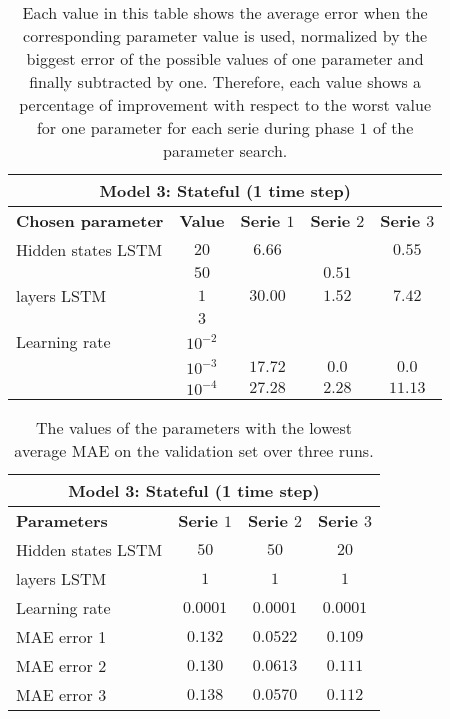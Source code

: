 \begin{table}[ht]
	\centering
	\begin{tabular}{@{}l||c|ccc@{}} \toprule
		\multicolumn{5}{c}{Model 3: Stateful (1 time step)}\\\midrule\midrule
		\textbf{Chosen parameter}	& \textbf{Value} & \textbf{Serie $ 1 $} & \textbf{Serie $ 2 $} & \textbf{Serie $ 3 $}\\\midrule
		Hidden states LSTM & $ 20 $ & $6.66 $		&  & $0.55 $\\
		& $ 50 $ & 		  		&	$ 0.51 $	   & 		\\\hline
		layers LSTM & $ 1 $ & $30.00 $		&	$ 1.52 $	   & 	$7.42$	\\
		& $ 3 $ & 	      		& 			 & \\\hline
		Learning rate & $ 10^{-2} $ &       &		   & 		\\
		& $  10^{-3} $ &$17.72 $&$0.0$  & $0.0$\\
		& $  10^{-4} $ &$27.28 $&$ 2.28$    & $11.13$\\\bottomrule
		
	\end{tabular}
	\caption{Each value in this table shows the average error when the corresponding parameter value is used, normalized by the biggest error of the possible values of one parameter and finally subtracted by one. Therefore, each value shows a percentage of improvement with respect to the worst value for one parameter for each serie during phase $ 1 $ of the parameter search.}
	\label{tab:relative_performance_parameters_phase_one_model_three}
\end{table}

\begin{table}[ht]
	\centering
	\begin{tabular}{@{}l|ccc@{}} \toprule
		\multicolumn{4}{c}{Model 3: Stateful (1 time step)}\\\midrule\midrule
		\textbf{Parameters}	& \textbf{Serie $ 1 $} & \textbf{Serie $ 2 $} & \textbf{Serie $ 3 $}\\\midrule
		Hidden states LSTM  & $50 $&$ 50 $  & $20 $\\
		layers LSTM & $1 $&$ 1 $  & $1$\\
		Learning rate & $0.0001 $&$ 0.0001$  & $0.0001$\\\hline
		MAE error 1   & $ 0.132 $ & $ 0.0522 $ & $ 0.109 $\\
		MAE error 2   & $ 0.130 $ & $ 0.0613 $ & $ 0.111 $\\
		MAE error 3   & $ 0.138 $ & $ 0.0570 $ & $ 0.112 $\\\bottomrule
	\end{tabular}
	\caption{The values of the parameters with the lowest average MAE on the validation set over three runs.}
	\label{tab:best_performing_para_phase1_model3}
\end{table}

